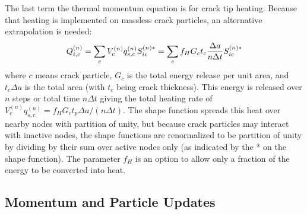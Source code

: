 \documentclass[11pt]{article}
\begin{document}
The last term the thermal momentum equation is for crack tip heating. Because that heating is implemented on massless crack particles, an alternative extrapolation is needed:
\begin{equation}
     Q_{i,c}^{(n)} =  \sum_c V_c^{(n)}  q_{s,c}^{(n)} S^{(n)*}_{ic}  = \sum_c f_H G_c t_c{ \Delta a \over n\Delta t }S^{(n)*}_{ic}
\end{equation}
where $c$ means crack particle, $G_c$ is the total energy release per unit area, and $t_c\Delta a$ is the total area (with $t_c$ being crack thickness). This energy is released over $n$ steps or total time $n\Delta t$ giving the total heating rate of $V_c^{(n)}  q_{s,c}^{(n)}  = f_HG_c t_p \Delta a / (n\Delta t )$. The shape function spreads this heat over nearby nodes with partition of unity, but because crack particles may interact with inactive nodes, the shape functions are renormalized to be partition of unity by dividing by their sum over active nodes only (as indicated by the * on the shape function). The parameter $f_H$ is an option to allow only a fraction of the energy to be converted into heat.

\subsection{Momentum and Particle Updates}
\end{document}
